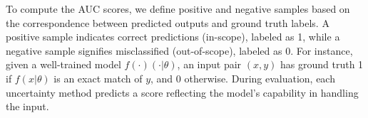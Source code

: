 To compute the AUC scores, we define positive and negative samples based on the correspondence between predicted outputs and ground truth labels. A positive sample indicates correct predictions (in-scope), labeled as 1, while a negative sample signifies misclassified (out-of-scope), labeled as 0. For instance, given a well-trained model $f(\cdot)(·|\theta)$, an input pair $(x,y)$ has ground truth 1 if $f(x|\theta)$ is an exact match of $y$, and 0 otherwise. During evaluation, each uncertainty method predicts a score reflecting the model's capability in handling the input.


